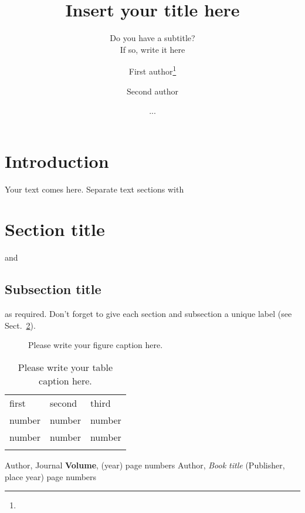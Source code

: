 \documentclass[epjST]{svjour}
\begin{document}
%
\title{Insert your title here}
\subtitle{Do you have a subtitle?\\ If so, write it here}
\author{First author\fnmsep\thanks{} \and Second author \and ... }
%
%
%
\maketitle
%
\section{Introduction}
\label{intro}
Your text comes here. Separate text sections with
\section{Section title}
\label{sec:1}
and \cite{RefJ}
\subsection{Subsection title}
\label{sec:2}
as required. Don't forget to give each section
and subsection a unique label (see Sect.~\ref{sec:1}).
%

\begin{figure}
\caption{Please write your figure caption here.}
\label{fig:1}       %
\end{figure}
%
\begin{table}
\caption{Please write your table caption here.}
\label{tab:1}       %
\begin{tabular}{lll}
\hline\noalign{\smallskip}
first & second & third  \\
\noalign{\smallskip}\hline\noalign{\smallskip}
number & number & number \\
number & number & number \\
\noalign{\smallskip}\hline
\end{tabular}
\end{table}
%
\begin{thebibliography}{}
Author, Journal \textbf{Volume}, (year) page numbers
Author, \textit{Book title} (Publisher, place year) page numbers
\end{thebibliography}
\end{document}
